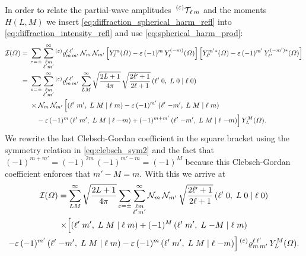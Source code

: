 In order to relate the partial-wave
amplitudes~$\prescript{(\ensuremath{\varepsilon})}{}{\mathcal{T}}_{\!\ell\, m}$ and the
moments~$H(L, M)$ we insert \cref{eq:diffraction_spherical_harm_refl}
into \cref{eq:diffraction_intensity_refl} and use
\cref{eq:spherical_harm_prod}:
\begin{align}
  \mathcal{I}(\Omega)
  ={}&
    \sum_{\refl = \pm} \sum_{\substack{\ell m \\ \ell' m'}}^\infty
    \prescript{(\refl)}{}{\varrho}^{\ell\, \ell'}_{m\, m'}\,
    \mathcal{N}_m\, \mathcal{N}_{m'}
    \sBrk[2]{Y_\ell^m(\Omega) - \refl\, (-1)^m\, Y_\ell^{(-m)}(\Omega)}
    \sBrk[2]{Y_{\ell'}^{m' *}(\Omega) - \refl\, (-1)^{m'}\, Y_{\ell'}^{(-m') *}(\Omega)}
  \\
  ={}& \begin{multlined}[t][0.85\columnwidth]
    \sum_{\refl = \pm} \sum_{\substack{\ell m \\ \ell' m'}}^\infty
    \prescript{(\refl)}{}{\varrho}^{\ell\, \ell'}_{m\, m'}\,
    \sum_{L M}^\infty \sqrt{\frac{2 L + 1}{4 \pi}}\, \sqrt{\frac{2 \ell' + 1}{2 \ell + 1}}\, \clebsch{\ell'}{0}{L}{0}{\ell}{0} \\
    \shoveleft{\times \mathcal{N}_m\, \mathcal{N}_{m'}\, \Big[ \clebsch{\ell'}{m'}{L}{M}{\ell}{m}                       - \refl\, (-1)^{m'}\, \clebsch{\ell'}{-m'}{L}{M}{\ell}{m}} \\
      - \refl\, (-1)^m\, \clebsch{\ell'}{m'}{L}{M}{\ell}{-m} + (-1)^{m + m'}\, \clebsch{\ell'}{-m'}{L}{M}{\ell}{-m} \Big]\,
    Y_L^M(\Omega).
  \end{multlined}
\end{align}
We rewrite the last Clebsch-Gordan coefficient in the square bracket
using the symmetry relation in \cref{eq:clebsch_sym2} and the fact
that $(-1)^{m + m'} = (-1)^{2m}\, (-1)^{m' - m} = (-1)^M$ because this
Clebsch-Gordan coefficient enforces that $m' - M = m$.  With this we
arrive at
\begin{multline}
  \mathcal{I}(\Omega)
  = \sum_{L M}^\infty \sqrt{\frac{2 L + 1}{4 \pi}}
  \sum_{\varepsilon = \pm} \sum_{\substack{\ell m \\ \ell' m'}}^\infty
  \mathcal{N}_m\, \mathcal{N}_{m'}\,
  \sqrt{\frac{2 \ell' + 1}{2 \ell + 1}}\,
  ({\ell'}\;{0},\;{L}\;{0}\; |\; {\ell}\;{0})
  \\
  \times \Big[
    ({\ell'}\;{m'},\;{L}\;{M}\; |\; {\ell}\;{m})
    + (-1)^M\, ({\ell'}\;{m'},\;{L}\;{-M}\; |\; {\ell}\;{m}) \\
    - \varepsilon\, (-1)^{m'}\, ({\ell'}\;{-m'},\;{L}\;{M}\; |\; {\ell}\;{m})
    - \varepsilon\, (-1)^m\, ({\ell'}\;{m'},\;{L}\;{M}\; |\; {\ell}\;{-m}) \Big]
  \prescript{(\ensuremath{\varepsilon})}{}{\varrho}^{\ell\, \ell'}_{m\, m'}\,
  Y_L^M(\Omega).
\end{multline}
